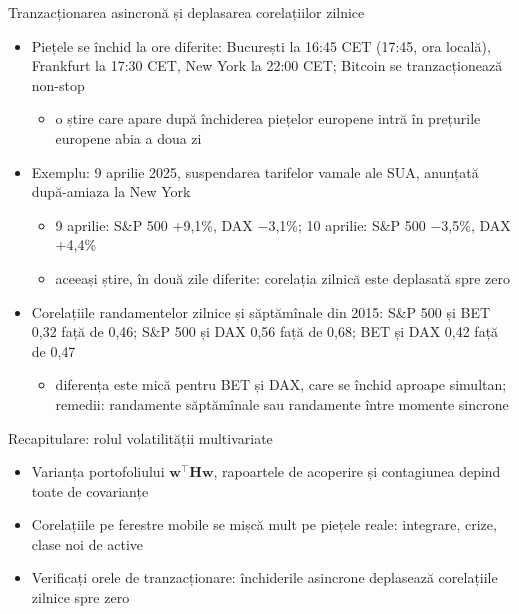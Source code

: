 \begin{frame}{Tranzacționarea asincronă și deplasarea corelațiilor zilnice}
\itemsize{\footnotesize}
\begin{itemize}
    \item Piețele se închid la ore diferite: București la 16:45 CET (17:45, ora locală), Frankfurt la 17:30 CET, New York la 22:00 CET; Bitcoin se tranzacționează non-stop
    \begin{itemize}
        \item o știre care apare după închiderea piețelor europene intră în prețurile europene abia a doua zi
    \end{itemize}
    \item Exemplu: 9 aprilie 2025, suspendarea tarifelor vamale ale SUA, anunțată după-amiaza la New York
    \begin{itemize}
        \item 9 aprilie: S\&P 500 +9{,}1\%, DAX $-$3{,}1\%; 10 aprilie: S\&P 500 $-$3{,}5\%, DAX +4{,}4\%
        \item aceeași știre, în două zile diferite: corelația zilnică este deplasată spre zero
    \end{itemize}
    \item Corelațiile randamentelor zilnice și săptămînale din 2015: S\&P 500 și BET 0{,}32 față de 0{,}46; S\&P 500 și DAX 0{,}56 față de 0{,}68; BET și DAX 0{,}42 față de 0{,}47
    \begin{itemize}
        \item diferența este mică pentru BET și DAX, care se închid aproape simultan; remedii: randamente săptămînale sau randamente între momente sincrone
    \end{itemize}
\end{itemize}
\end{frame}

\begin{frame}{Recapitulare: rolul volatilității multivariate}
\itemsize{\small}
\begin{itemize}
    \item Varianța portofoliului $\mathbf{w}^\top\mathbf{H}\mathbf{w}$, rapoartele de acoperire și contagiunea depind toate de covarianțe
    \item Corelațiile pe ferestre mobile se mișcă mult pe piețele reale: integrare, crize, clase noi de active
    \item Verificați orele de tranzacționare: închiderile asincrone deplasează corelațiile zilnice spre zero
\end{itemize}
\end{frame}


